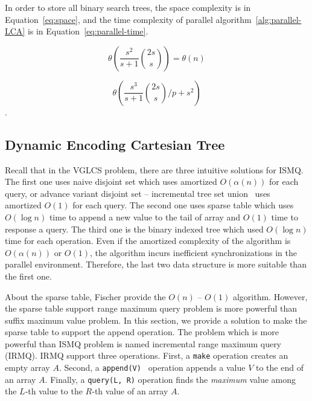 In order to store all binary search trees, the space complexity is in
Equation~\ref{eq:space}, and the time complexity of parallel
algorithm~\ref{alg:parallel-LCA} is in
Equation~\ref{eq:parallel-time}.


\begin{equation} \label{eq:space}
\theta\left(\frac{s^2}{s+1} \binom{2s}{s}\right) =
\theta\left(n\right)
\end{equation}


\begin{equation} \label{eq:parallel-time}
\theta\left(\frac{s^3}{s+1} \binom{2s}{s} \bigg/ p + s^2 \right)
\end{equation}.

\iffalse

為記錄所有的二元搜尋樹的 LCA，空間消耗 $\theta\left(\frac{s^2}{s+1}
\binom{2s}{s}\right) = \theta\left(n\right)$；其平行算法
\ref{alg:parallel-LCA} 的時間複雜度如下：

\begin{equation}
\theta\left(\frac{s^3}{s+1} \binom{2s}{s} \bigg/ p + s^2 \right)
\end{equation}.
\fi



\subsection{Dynamic Encoding Cartesian Tree}

Recall that in the VGLCS problem, there are three intuitive solutions
for ISMQ.  The first one uses naive disjoint set which uses amortized
$O(\alpha(n))$ for each query, or advance variant disjoint set --
incremental tree set union~\cite{Gabow1983ALA} uses amortized $O(1)$
for each query.  The second one uses sparse table which uses $O(\log
n)$ time to append a new value to the tail of array and $O(1)$ time to
response a query.  The third one is the binary indexed tree which used
$O(\log n)$ time for each operation.  Even if the amortized complexity
of the algorithm is $O(\alpha(n))$ or $O(1)$, the algorithm incurs
inefficient synchronizations in the parallel environment. Therefore,
the last two data structure is more suitable than the first one.

About the sparse table, Fischer provide the $O(n)$ -- $O(1)$
algorithm.  However, the sparse table support range maximum query
problem is more powerful than suffix maximum value problem.  In this
section, we provide a solution to make the sparse table to support the
append operation. The problem which is more powerful than ISMQ problem
is named incremental range maximum query (IRMQ).  IRMQ support three
operations.  First, a {\tt make} operation creates an empty array $A$.
Second, a {\tt append(V) } operation appends a value $V$ to the end of
an array $A$.  Finally, a {\tt query(L, R)} operation finds the {\em
  maximum} value among the $L$-th value to the $R$-th value of an
array $A$.

